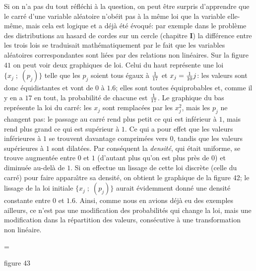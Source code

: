 Si on n'a pas du tout r\'efl\'echi \`a la question, on peut \^etre surpris
d'apprendre que le carr\'e d'une variable al\'eatoire n'ob\'eit pas \`a la 
m\^eme loi que la variable elle-m\^eme, mais cela est logique et a d\'ej\`a
\'et\'e \'evoqu\'e: par exemple dans le probl\`eme des distributions au 
hasard de cordes sur un cercle (chapitre {\bf I}) la diff\'erence entre les
trois lois se traduisait math\'ematiquement par le fait que les variables
al\'eatoires correspondantes sont li\'ees par des relations non lin\'eaires.
Sur la figure $41$ on peut voir deux graphiques de loi. Celui du haut
repr\'esente une loi $\{ x_j\; ; \; (p_j) \}$ telle que les $p_j$ soient tous
\'egaux \`a $1 \over 17$ et $x_j = {1 \over 10}j$: les valeurs sont donc 
\'equidistantes et vont de $0$ \`a $1.6$; elles sont toutes \'equiprobables
et, comme il y en a $17$ en tout,  la probabilit\'e de chacune est $1 \over
17$. Le graphique du bas repr\'esente la loi du carr\'e: les $x_j$ sont 
remplac\'ees par les $x_j^2$, mais les $p_j$ ne changent pas: le passage 
au carr\'e rend plus petit ce qui est inf\'erieur \`a $1$, mais rend plus 
grand ce qui est sup\'erieur \`a $1$. Ce qui a pour effet que les valeurs
inf\'erieures \`a $1$ se trouvent davantage comprim\'ees vers $0$, 
tandis que les valeurs sup\'erieures \`a $1$ sont dilat\'ees. Par
cons\'equent la {\it densit\'e},  qui \'etait uniforme, se trouve 
augment\'ee entre $0$ et $1$ (d'autant plus qu'on est plus pr\`es de $0$) 
et diminu\'ee au-del\`a de $1$. Si on effectue un lissage de cette loi
discr\`ete (celle du carr\'e) pour faire appara{\^\i}tre sa densit\'e, on
obtient le graphique de la figure 42; le lissage de la loi initiale $\{ x_j\; ;
\; (p_j) \}$ aurait \'evidemment donn\'e une densit\'e constante entre $0$
et $1.6$. Ainsi, comme nous en avions d\'ej\`a eu des exemples ailleurs, 
ce n'est pas une modification des probabilit\'es qui change la loi, mais 
une modification dans la r\'epartition des valeurs, cons\'ecutive \`a
une transformation non lin\'eaire. 
\medskip

\midinsert
\epsfxsize = \hsize
{}
\vskip6mm
\centerline{\eightpoint figure 43}
\vskip6mm
\endinsert

